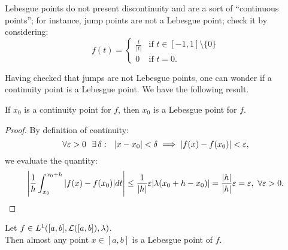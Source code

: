 Lebesgue points do not present discontinuity and are a sort of ``continuous points''; for instance, jump points are not a Lebesgue point; check it by considering:
$$
	f(t) = 
	\begin{cases}
		\frac{t}{|t|} & \text{if } t\in [-1,1] \setminus \{0\} \\
		0 & \text{if } t=0
	.
	\end{cases}
$$

Having checked that jumps are not Lebesgue points, one can wonder if a continuity point is a Lebesgue point. We have the following result.

\begin{theo}
	If $x_0$ is a continuity point for $f$, then $x_0$ is a Lebesgue point for $f$.
\end{theo}

\begin{proof}
	By definition of continuity:
	$$
		\forall \varepsilon >0 \ \ \exists \, \delta :\ \ | x-x_0| < \delta \implies | f( x) -f( x_0)| < \varepsilon ,
	$$
	we evaluate the quantity:
	$$
	\left| \frac{1}{h}\int_{x_0}^{x_0+h}| f( x) -f( x_0)| dt\right| \leq \frac{1}{| h| } \eps | \lambda ( x_0 +h-x_0)| =\frac{|h|}{|h|} \eps =\eps ,\ \forall \eps >0.
	$$
\end{proof}

\begin{theo}\label{theo-lebesgue-points}
	Let $f\in L^1([a,b],\mathcal L([a,b]),\lambda)$. \\
	Then almost any point $x\in[a,b]$ is a Lebesgue point of $f$. \footnotemark{}
\end{theo}


